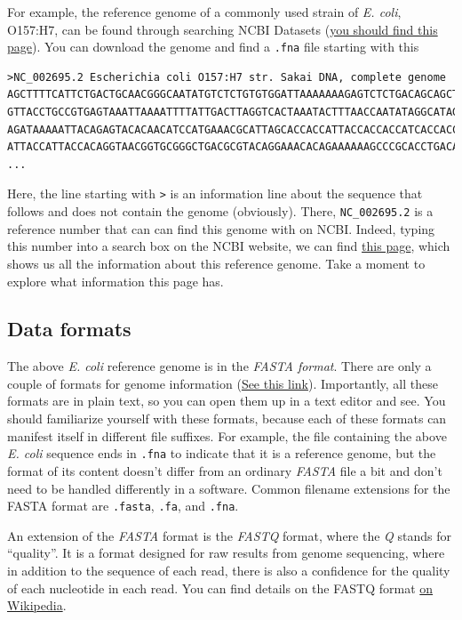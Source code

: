 \documentclass[12pt,letterpaper]{article}
\begin{document}
For example, the reference genome of a commonly used strain of \textit{E. coli}, O157:H7, can be found through searching NCBI Datasets (\href{https://www.ncbi.nlm.nih.gov/datasets/taxonomy/83334/}{you should find this page}). You can download the genome and find a \texttt{.fna} file starting with this

\begin{verbatim}
>NC_002695.2 Escherichia coli O157:H7 str. Sakai DNA, complete genome
AGCTTTTCATTCTGACTGCAACGGGCAATATGTCTCTGTGTGGATTAAAAAAAGAGTCTCTGACAGCAGCTTCTGAACTG
GTTACCTGCCGTGAGTAAATTAAAATTTTATTGACTTAGGTCACTAAATACTTTAACCAATATAGGCATAGCGCACAGAC
AGATAAAAATTACAGAGTACACAACATCCATGAAACGCATTAGCACCACCATTACCACCACCATCACCACCACCATCACC
ATTACCATTACCACAGGTAACGGTGCGGGCTGACGCGTACAGGAAACACAGAAAAAAGCCCGCACCTGACAGTGCGGGCT
...
\end{verbatim}

Here, the line starting with \texttt{>} is an information line about the sequence that follows and does not contain the genome (obviously). There, \texttt{NC\_002695.2} is a reference number that can can find this genome with on NCBI. Indeed, typing this number into a search box on the NCBI website, we can find \href{https://www.ncbi.nlm.nih.gov/nuccore/NC_002695.2/}{this page}, which shows us all the information about this reference genome. Take a moment to explore what information this page has.

\subsection{Data formats}

The above \textit{E. coli} reference genome is in the \textit{FASTA format}. There are only a couple of formats for genome information (\href{https://www.animalgenome.org/bioinfo/resources/manuals/seqformats}{See this link}). Importantly, all these formats are in plain text, so you can open them up in a text editor and see. You should familiarize yourself with these formats, because each of these formats can manifest itself in different file suffixes. For example, the file containing the above \textit{E. coli} sequence ends in \texttt{.fna} to indicate that it is a reference genome, but the format of its content doesn't differ from an ordinary \textit{FASTA} file a bit and don't need to be handled differently in a software. Common filename extensions for the FASTA format are \texttt{.fasta}, \texttt{.fa}, and \texttt{.fna}.

An extension of the \textit{FASTA} format is the \textit{FASTQ} format, where the \textit{Q} stands for ``quality''. It is a format designed for raw results from genome sequencing, where in addition to the sequence of each read, there is also a confidence for the quality of each nucleotide in each read. You can find details on the FASTQ format \href{https://en.wikipedia.org/wiki/FASTQ_format}{on Wikipedia}.
\end{document}

